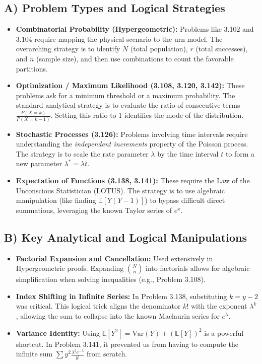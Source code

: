 \documentclass[11pt]{article}
\theoremstyle{definition}
\theoremstyle{remark}
\begin{document}
\subsection{A) Problem Types and Logical Strategies}
\begin{itemize}
    \item \textbf{Combinatorial Probability (Hypergeometric):} Problems like 3.102 and 3.104 require mapping the physical scenario to the urn model. The overarching strategy is to identify $N$ (total population), $r$ (total successes), and $n$ (sample size), and then use combinations to count the favorable partitions.
    \item \textbf{Optimization / Maximum Likelihood (3.108, 3.120, 3.142):} These problems ask for a minimum threshold or a maximum probability. The standard analytical strategy is to evaluate the ratio of consecutive terms $\frac{P(X=k)}{P(X=k-1)}$. Setting this ratio to 1 identifies the mode of the distribution.
    \item \textbf{Stochastic Processes (3.126):} Problems involving time intervals require understanding the \textit{independent increments} property of the Poisson process. The strategy is to scale the rate parameter $\lambda$ by the time interval $t$ to form a new parameter $\lambda^* = \lambda t$.
    \item \textbf{Expectation of Functions (3.138, 3.141):} These require the Law of the Unconscious Statistician (LOTUS). The strategy is to use algebraic manipulation (like finding $\mathbb{E}[Y(Y-1)]$) to bypass difficult direct summations, leveraging the known Taylor series of $e^x$.
\end{itemize}

\subsection{B) Key Analytical and Logical Manipulations}
\begin{itemize}
    \item \textbf{Factorial Expansion and Cancellation:} Used extensively in Hypergeometric proofs. Expanding $\binom{N}{n}$ into factorials allows for algebraic simplification when solving inequalities (e.g., Problem 3.108).
    \item \textbf{Index Shifting in Infinite Series:} In Problem 3.138, substituting $k = y - 2$ was critical. This logical trick aligns the denominator $k!$ with the exponent $\lambda^k$, allowing the sum to collapse into the known Maclaurin series for $e^\lambda$.
    \item \textbf{Variance Identity:} Using $\mathbb{E}[Y^2] = \text{Var}(Y) + (\mathbb{E}[Y])^2$ is a powerful shortcut. In Problem 3.141, it prevented us from having to compute the infinite sum $\sum y^2 \frac{\lambda^y e^{-\lambda}}{y!}$ from scratch.
\end{itemize}
\end{document}
